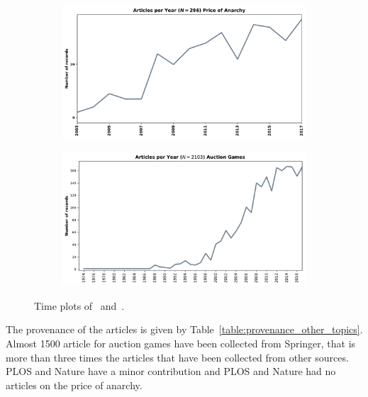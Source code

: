 \documentclass{article}
\theoremstyle{definition}
\begin{document}
\begin{center}
\begin{figure}[!hbtp]
    \begin{subfigure}{0.5\textwidth}
        \includegraphics[width=\textwidth]{./assets/images/anarchy_timeline.pdf}
    \end{subfigure}
    \begin{subfigure}{0.5\textwidth}
        \includegraphics[width=\textwidth]{./assets/images/auction_timeline.pdf}
    \end{subfigure}
\caption{Time plots of~\cite{} and~\cite{}.}
\label{fig:timeplots_other_topics}
\end{figure}
\end{center}

The provenance of the articles is given by Table~\ref{table:provenance_other_topics}.
Almost 1500 article for auction games have been collected from Springer, that is
more than three times the articles that have been collected from other sources.
PLOS and Nature have a minor contribution and PLOS and Nature had no
articles on the price of anarchy.
\end{document}
